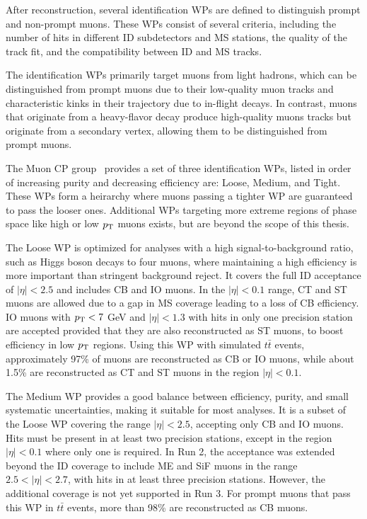 After reconstruction, several identification WPs are defined to distinguish prompt and non-prompt muons. These WPs consist of several criteria, including the number of hits in different ID subdetectors and MS stations, the quality of the track fit, and the compatibility between ID and MS tracks. 

The identification WPs primarily target muons from light hadrons, which can be distinguished from prompt muons due to their low-quality muon tracks and characteristic kinks in their trajectory due to in-flight decays. In contrast, muons that originate from a heavy-flavor decay produce high-quality muons tracks but originate from a secondary vertex, allowing them to be distinguished from prompt muons.

The Muon CP group~\cite{ATLAS:MCPDocs} provides a set of three identification WPs, listed in order of increasing purity and decreasing efficiency are: Loose, Medium, and Tight. These WPs form a heirarchy where muons passing a tighter WP are guaranteed to pass the looser ones. Additional WPs targeting more extreme regions of phase space like high or low $p_{\mathrm{T}}$ muons exists, but are beyond the scope of this thesis. 

The Loose WP is optimized for analyses with a high signal-to-background ratio, such as Higgs boson decays to four muons, where maintaining a high efficiency is more important than stringent background reject. It covers the full ID acceptance of $|\eta| < 2.5$ and includes CB and IO muons. In the $|\eta| < 0.1$ range, CT and ST muons are allowed due to a gap in MS coverage leading to a loss of CB efficiency. IO muons with $p_{\mathrm{T}} < 7$ GeV and $|\eta| < 1.3$ with hits in only one precision station are accepted provided that they are also reconstructed as ST muons, to boost efficiency in low $p_{\mathrm{T}}$ regions. Using this WP with simulated $t\bar{t}$ events, approximately 97\% of muons are reconstructed as CB or IO muons, while about 1.5\% are reconstructed as CT and ST muons in the region $|\eta| < 0.1$.~\cite{ATLAS:2020auj}

The Medium WP provides a good balance between efficiency, purity, and small systematic uncertainties, making it suitable for most analyses. It is a subset of the Loose WP covering the range $|\eta| < 2.5$, accepting only CB and IO muons. Hits must be present in at least two precision stations, except in the region $|\eta| < 0.1$ where only one is required. In Run 2, the acceptance was extended beyond the ID coverage to include ME and SiF muons in the range $2.5 < |\eta| < 2.7$, with hits in at least three precision stations. However, the additional coverage is not yet supported in Run 3. For prompt muons that pass this WP in $t\bar{t}$ events, more than 98\% are reconstructed as CB muons.

